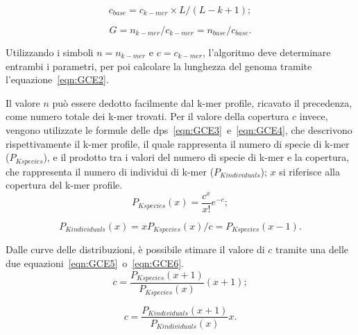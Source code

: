 \documentclass[crop=false, class=book]{standalone}
\begin{document}
	\begin{equation}
		\label{eqn:GCE1}
		c_{base} = c_{k-mer} \times L / (L-k+1);
	\end{equation}

	\begin{equation}
		\label{eqn:GCE2}
		G = n_{k-mer} / c_{k-mer} = n_{base} / c_{base}.
	\end{equation}
	
	Utilizzando i simboli $n = n_{k-mer}$ e $c = c_{k-mer}$, l'algoritmo deve determinare entrambi i parametri, per poi calcolare la lunghezza del genoma tramite l'equazione~\vref{eqn:GCE2}.
	
	Il valore $n$ può essere dedotto facilmente dal k-mer profile, ricavato il precedenza, come numero totale dei k-mer trovati. Per il valore della copertura $c$ invece, vengono utilizzate le formule delle \glspl{dp}~\vref{eqn:GCE3}~e~\vref{eqn:GCE4}, che descrivono rispettivamente il k-mer profile, il quale rappresenta il numero di specie di k-mer ($P_{Kspecies}$), e il prodotto tra i valori del numero di specie di k-mer e la copertura, che rappresenta il numero di individui di k-mer ($P_{Kindividuals}$); $x$ si riferisce alla copertura del k-mer profile.
	\begin{equation}
		\label{eqn:GCE3}
		P_{Kspecies}(x) = \frac{c^x}{x!} e^{-c};
	\end{equation}

	\begin{equation}
		\label{eqn:GCE4}
		P_{Kindividuals}(x) = x P_{Kspecies}(x) / c = P_{Kspecies}(x-1).
	\end{equation}
	
	Dalle curve delle distribuzioni, è possibile stimare il valore di $c$ tramite una delle due equazioni~\vref{eqn:GCE5}~o~\vref{eqn:GCE6}.
	\begin{equation}
		\label{eqn:GCE5}
		c = \frac{P_{Kspecies}(x+1)}{P_{Kspecies}(x)} (x+1);
	\end{equation}
	
	\begin{equation}
		\label{eqn:GCE6}
		c = \frac{P_{Kindividuals}(x+1)}{P_{Kindividuals}(x)} x.
	\end{equation}
\end{document}
